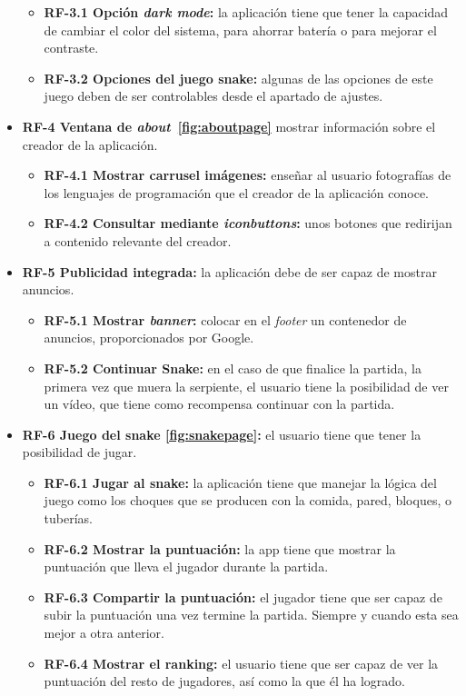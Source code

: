 \begin{itemize}
	\begin{itemize}
		\tightlist
		\item \textbf{RF-3.1 Opción \emph{dark mode}:} la aplicación tiene que tener la capacidad de cambiar el color del sistema, para ahorrar batería o para mejorar el contraste.
		\item \textbf{RF-3.2 Opciones del juego snake:} algunas de las opciones de este juego deben de ser controlables desde el apartado de ajustes.
	\end{itemize}
	
	\item \textbf{RF-4 Ventana de \emph{about}~\ref{fig:aboutpage}} mostrar información sobre el creador de la aplicación.
	
	\begin{itemize}
		\tightlist
		\item \textbf{RF-4.1 Mostrar carrusel imágenes:} enseñar al usuario fotografías de los lenguajes de programación que el creador de la aplicación conoce.
		\item \textbf{RF-4.2 Consultar mediante \emph{iconbuttons}:} unos botones que redirijan a contenido relevante del creador.
	\end{itemize}
	
	\item \textbf{RF-5 Publicidad integrada:} la aplicación debe de ser capaz de mostrar anuncios.
	
	\begin{itemize}
		\tightlist
		\item \textbf{RF-5.1 Mostrar \emph{banner}:} colocar en el \emph{footer} un contenedor de anuncios, proporcionados por Google.
		\item \textbf{RF-5.2 Continuar Snake:} en el caso de que finalice la partida, la primera vez que muera la serpiente, el usuario tiene la posibilidad de ver un vídeo, que tiene como recompensa continuar con la partida. 
	\end{itemize}

	\item \textbf{RF-6 Juego del snake \ref{fig:snakepage}:} el usuario tiene que tener la posibilidad de jugar.
	
	\begin{itemize}
		\tightlist
		\item \textbf{RF-6.1 Jugar al snake:} la aplicación tiene que manejar la lógica del juego como los choques que se producen con la comida, pared, bloques, o tuberías.
		\item \textbf{RF-6.2 Mostrar la puntuación:} la app tiene que mostrar la puntuación que lleva el jugador durante la partida.
		\item \textbf{RF-6.3 Compartir la puntuación:} el jugador tiene que ser capaz de subir la puntuación una vez termine la partida. Siempre y cuando esta sea mejor a otra anterior.
		\item \textbf{RF-6.4 Mostrar el ranking:} el usuario tiene que ser capaz de ver la puntuación del resto de jugadores, así como la que él ha logrado.
	\end{itemize}


\end{itemize}
